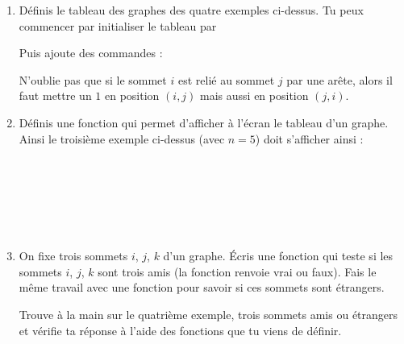 \documentclass[11pt,class=report,crop=false]{standalone}
\begin{document}
\begin{activite}
\begin{enumerate}
  \item Définis le tableau des graphes des quatre exemples ci-dessus.
  Tu peux commencer par initialiser le tableau par   
  
  Puis ajoute des commandes : 
  
  N'oublie pas que si le sommet $i$ est relié au sommet $j$ par une arête, alors il faut mettre un $1$ en position $(i,j)$ mais aussi en position $(j,i)$. 
  
  \item Définis une fonction  qui permet d'afficher à l'écran le tableau d'un graphe.
  Ainsi le troisième exemple ci-dessus (avec $n=5$) doit s'afficher ainsi :
\begin{center}
\\
\\
\\
\\
\\
\end{center}

  \item On fixe trois sommets $i$, $j$, $k$ d'un graphe. Écris une fonction  qui teste si les sommets $i$, $j$, $k$ sont trois amis (la fonction renvoie \og{}vrai\fg{} ou \og{}faux\fg{}). Fais le même travail avec une fonction  pour savoir si ces sommets sont étrangers.
  
Trouve à la main sur le quatrième exemple, trois sommets amis ou étrangers et vérifie ta réponse à l'aide des fonctions que tu viens de définir.

\end{enumerate}   
     
\end{activite}


\end{document}
